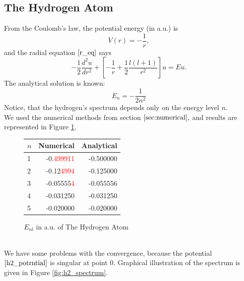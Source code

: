 \documentclass[a4paper, 14pt]{article}
\begin{document}
\subsection{The Hydrogen Atom}
From the Coulomb's law, the potential energy (in a.u.) is 
\begin{equation}\label{h2_potrntial}
	V(r) = -\frac{1}{r},
\end{equation}
and the radial equation $\eqref{r_eq}$  says
$$-\frac{1}{2}\frac{d^2 u}{dr^2}+[-\frac{1}{r}+\frac{1}{2}\frac{l(l+1)}{r^2}]u = Eu.$$
The analytical solution is known:
\begin{equation}\label{h2_sol}
   E_n = -\frac{1}{2 n^2}
\end{equation}
Notice, that the hydrogen's spectrum depends only on the energy level $n$.\\
We used the numerical methods from section $\ref{sec:numerical},$ and results are represented in Figure \ref{fig:h2_bar}.
\begin{figure}[h!]
\centering
\begin{tabular}{lrr}
\toprule
\centering
$n$ &         Numerical &         Analytical \\
\midrule
1 & -0.\textcolor{red}{499911} & -0.500000 \\
2 & -0.12\textcolor{red}{4994} & -0.125000 \\
3 & -0.05555\textcolor{red}{4} & -0.055556 \\
4 & -0.031250 & -0.031250 \\
5 & -0.020000 & -0.020000 \\
\bottomrule
\end{tabular}
\caption{$E_{nl}$ in a.u. of The Hydrogen Atom}
\label{fig:h2_bar}
\end{figure}\\
We have some problems with the convergence, because the potential $\eqref{h2_potrntial}$ is singular at point 0. Graphical illustration of the spectrum is given in Figure \ref{fig:h2_spectrum}.
\end{document}
